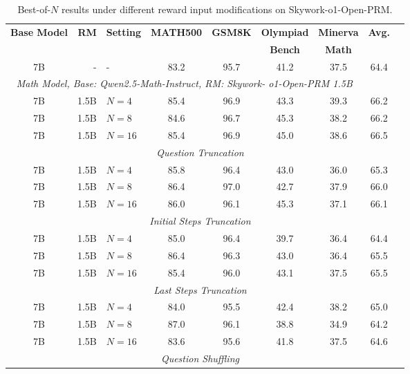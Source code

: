 \documentclass{article}
\begin{document}
\begin{table*}[!ht]
\caption{Best-of-$N$ results under different reward input modifications on Skywork-o1-Open-PRM.}
\label{tab:qwen}
\vskip 0.1in
\scriptsize
\begin{center}
\begin{tabular}{crlcccccl}
\toprule
\multirow{2}{*}{\textbf{Base Model}} & \multirow{2}{*}{\textbf{RM}} & \multirow{2}{*}{\textbf{Setting}} & \multirow{2}{*}{\textbf{MATH500}} & \multirow{2}{*}{\textbf{GSM8K}} &  \textbf{Olympiad} &  \textbf{Minerva} & \multirow{2}{*}{\textbf{Avg.}} \\
 & & & &  &  \textbf{Bench} &  \textbf{Math} \\
\midrule
7B & - & - & 83.2 & 95.7 & 41.2 & 37.5 &  64.4\\
\midrule
\multicolumn{7}{c}{\textit{Math Model, Base: Qwen2.5-Math-Instruct, RM: Skywork-
o1-Open-PRM 1.5B}} \\
\midrule
 7B & 1.5B & $N=4$ & 85.4 & 96.9 & 43.3 & 39.3 & 66.2\\
 7B & 1.5B & $N=8$ & 84.6 & 96.7 & 45.3 & 38.2 & 66.2\\
 7B & 1.5B & $N=16$ & 85.4 & 96.9 & 45.0 & 38.6 & 66.5\\
\cmidrule(lr){1-8}
\multicolumn{8}{c}{\textit{Question Truncation}} \\
 7B & 1.5B & $N=4$ & 85.8 & 96.4 & 43.0 & 36.0 & 65.3\\
 7B & 1.5B & $N=8$ & 86.4 & 97.0 & 42.7 & 37.9& 66.0\\
 7B & 1.5B & $N=16$ & 86.0 & 96.1 & 45.3 & 37.1 & 66.1\\
\multicolumn{8}{c}{\textit{Initial Steps Truncation}} \\
 7B & 1.5B & $N=4$ & 85.0 & 96.4 & 39.7 & 36.4 & 64.4\\
 7B & 1.5B & $N=8$ & 86.4 & 96.3 & 43.0 & 36.4& 65.5\\
 7B & 1.5B & $N=16$ & 85.4 & 96.0 & 43.1 & 37.5 & 65.5\\
\multicolumn{8}{c}{\textit{Last Steps Truncation}} \\
 7B & 1.5B & $N=4$ & 84.0 & 95.5 & 42.4 & 38.2 & 65.0\\
 7B & 1.5B & $N=8$ & 87.0 & 96.1 & 38.8 & 34.9 & 64.2\\
 7B & 1.5B & $N=16$ & 83.6	& 95.6 & 41.8 & 37.5 & 64.6\\
\multicolumn{8}{c}{\textit{Question Shuffling}} \\

\end{tabular}
\end{center}
\end{table*}
\end{document}
